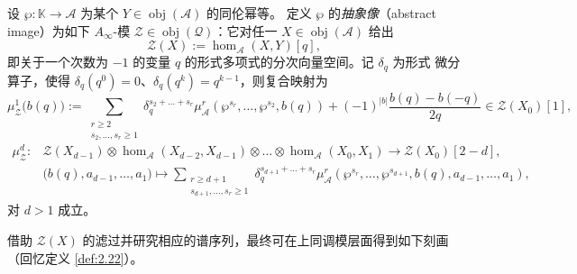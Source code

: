 \begin{Def}\label{def:4.7}
设 $\wp:\mathbb K\to\mathcal A$ 为某个 $Y\in\operatorname{obj}(\mathcal A)$ 的同伦幂等。
定义 $\wp$ 的\emph{抽象像}（abstract image）为如下 $A_\infty$-模
$\mathcal Z\in\operatorname{obj}(\mathcal Q)$：它对任一
$X\in\operatorname{obj}(\mathcal A)$ 给出
\[
  \mathcal Z(X):=\hom_{\mathcal A}(X,Y)[q],
\]
即关于一个次数为 $-1$ 的变量 $q$ 的形式多项式的分次向量空间。记 $\delta_q$ 为形式
微分算子，使得 $\delta_q(q^0)=0$、$\delta_q(q^k)=q^{k-1}$，则复合映射为
\[
  \mu^1_{\mathcal Z}\bigl(b(q)\bigr)
  :=\sum_{\substack{r\ge2\\ s_2,\dots,s_r\ge1}}
    \delta_q^{s_2+\dots+s_r}\mu^r_{\mathcal A}
    (\wp^{s_r},\dots,\wp^{s_2},b(q))
  +(-1)^{|b|}\frac{b(q)-b(-q)}{2q}
  \in\mathcal Z(X_0)[1],
\]
\[
  \begin{aligned}
  \mu^d_{\mathcal Z}:{}&\mathcal Z(X_{d-1})\otimes
    \hom_{\mathcal A}(X_{d-2},X_{d-1})\otimes\dots\otimes
    \hom_{\mathcal A}(X_0,X_1)\longrightarrow\mathcal Z(X_0)[2-d],\\
  &\bigl(b(q),a_{d-1},\dots,a_1\bigr)\longmapsto
    \sum_{\substack{r\ge d+1\\ s_{d+1},\dots,s_r\ge1}}
    \delta_q^{s_{d+1}+\dots+s_r}\mu^r_{\mathcal A}
    (\wp^{s_r},\dots,\wp^{s_{d+1}},b(q),a_{d-1},\dots,a_1),
  \end{aligned}
\]
对 $d>1$ 成立。
\end{Def}

借助 $\mathcal Z(X)$ 的滤过并研究相应的谱序列，最终可在上同调模层面得到如下刻画
（回忆定义 \ref{def:2.22}）。

